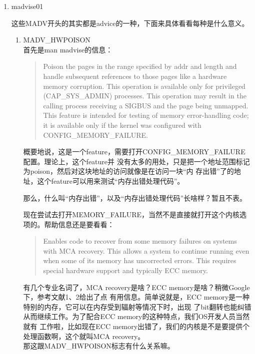 \documentclass[scheme=plain]{ctexart}
\begin{document}
\begin{enumerate}
\item madvise01
  
  这些MADV开头的其实都是advice的一种，下面来具体看看每种是什么意义。
  \begin{enumerate}
  \item MADV\_HWPOISON\\
    首先是man madvise的信息：
    \begin{quote}
      Poison the pages in the range specified by addr and length and handle subsequent
      references to those pages like a hardware memory corruption.  This operation  is
      available only for privileged (CAP\_SYS\_ADMIN) processes.  This operation may
      result in the calling process receiving a SIGBUS and the page being unmapped.\\
      
      This feature is intended for testing of memory error-handling code; it is available
      only if the kernel was configured with CONFIG\_MEMORY\_FAILURE.
    \end{quote}
    概要地说，这是一个feature，需要打开CONFIG\_MEMORY\_FAILURE配置。理论上，这个feature并
    没有太多的用处，只是把一个地址范围标记为poison，然后对这块地址的访问就像是在访问一块“内
    存出错”了的地址，这个feature可以用来测试“内存出错处理代码”。

    那么，什么叫“内存出错”，以及“内存出错处理代码”长啥样？暂且不表。

    现在尝试去打开MEMORY\_FAILURE，当然不是直接就打开这个内核选项的。帮助信息还是要看看：
    \begin{quote}
      Enables code to recover from some memory failures on systems with MCA recovery. This
      allows a system to continue running even when some of its memory has uncorrected
      errors. This requires special hardware support and typically ECC memory.
    \end{quote}

    有几个专业名词了，MCA recovery是啥？ECC memory是啥？稍微Google下，参考文献1、2给出了点
    有用信息。简单说就是，ECC memory是一种特别的内存，它可以在内存受到辐射等情况下时，出现
    了bit翻转也能纠错从而继续工作。为了配合ECC memory的这种特点，我们OS开发人员当然就有
    工作啦，比如现在ECC memory出错了，我们的内核是不是要提供个处理函数啊，这个就叫MCA
    recovery。\\
   
    那这跟MADV\_HWPOISON标志有什么关系嘛。\\
    

\end{enumerate}
\end{enumerate}
\end{document}
